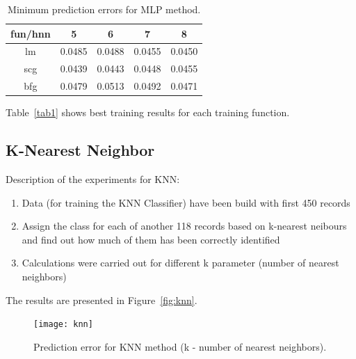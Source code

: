 \documentclass[
10pt, %
a4paper, %
oneside, %
headinclude,footinclude, %
BCOR5mm, %
]{scrartcl}
\begin{document}

\begin{table}[H]
	\centering
	\begin{tabular}{ | c | c | c | c | c | }
    \hline
     fun/hnn & 5 & 6 & 7 & 8 \\ \hline
    lm & 0.0485 & 0.0488 & 0.0455 & \cellcolor{gray(x11gray)!25}0.0450 \\ \hline
    scg & \cellcolor{amber!25}0.0439 & 0.0443 & 0.0448 & 0.0455 \\ \hline
    bfg & 0.0479 & 0.0513 & 0.0492 & \cellcolor{antiquebrass!25}0.0471 \\ \hline
  	\end{tabular}
  	\caption{Minimum prediction errors for MLP method.}
  	\label{tab1}
\end{table}

Table~\vref{tab1} shows best training results for each training function. %

\subsection{K-Nearest Neighbor}

Description of the experiments for KNN:
\begin{enumerate}[noitemsep] %
\item Data (for training the KNN Classifier) have been build with first 450 records
\item Assign the class for each of another 118 records based on k-nearest neibours and find out how much of them has been correctly identified
\item Calculations were carried out for different k parameter (number of nearest neighbors)
\end{enumerate}
The results are presented in Figure~\vref{fig:knn}.

\begin{figure}[H]
\centering 
\texttt{[image: knn]} 
\caption[An example of a floating figure]{Prediction error for KNN method (k - number of nearest neighbors).} %
\label{fig:knn} 
\end{figure}
\end{document}
